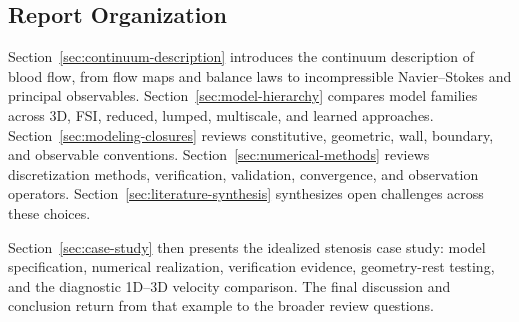 \subsection{Report Organization}
\label{subsec:report-organization}

Section~\ref{sec:continuum-description} introduces the continuum description of
blood flow, from flow maps and balance laws to incompressible Navier--Stokes
and principal observables. Section~\ref{sec:model-hierarchy} compares model
families across 3D, FSI, reduced, lumped, multiscale, and learned approaches.
Section~\ref{sec:modeling-closures} reviews constitutive, geometric, wall,
boundary, and observable conventions. Section~\ref{sec:numerical-methods}
reviews discretization methods, verification, validation, convergence, and
observation operators. Section~\ref{sec:literature-synthesis} synthesizes open
challenges across these choices.

Section~\ref{sec:case-study} then presents the idealized stenosis case study:
model specification, numerical realization, verification evidence,
geometry-rest testing, and the diagnostic 1D--3D velocity comparison. The final
discussion and conclusion return from that example to the broader review
questions.
